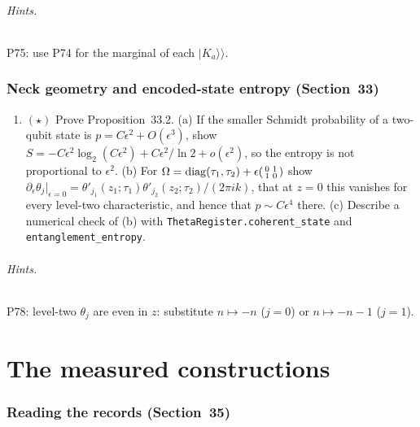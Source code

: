 \documentclass[11pt]{article}
\begin{document}
\paragraph{Hints.} P75: use P74 for the marginal of each $|K_a\rangle\!\rangle$.

\section{Neck geometry and encoded-state entropy (Section~33)}

\begin{enumerate}[label=\textbf{P\arabic*.},leftmargin=*,start=78]
\item $(\star)$ Prove Proposition~33.2. (a) If the smaller Schmidt probability of a
  two-qubit state is $p = C\epsilon^2+O(\epsilon^3)$, show
  $S = -C\epsilon^2\log_2(C\epsilon^2)+C\epsilon^2/\ln2+o(\epsilon^2)$, so the
  entropy is not proportional to $\epsilon^2$. (b) For
  $\Omega = \operatorname{diag}(\tau_1,\tau_2)+\epsilon\begin{psmallmatrix}0&1\\1&0\end{psmallmatrix}$
  show $\partial_\epsilon\theta_j|_{\epsilon=0} = \theta'_{j_1}(z_1;\tau_1)\theta'_{j_2}(z_2;\tau_2)/(2\pi ik)$,
  that at $z = 0$ this vanishes for every level-two characteristic, and
  hence that $p\sim C\epsilon^4$ there. (c) Describe a numerical check of (b)
  with \texttt{ThetaRegister.coherent\_state} and \texttt{entanglement\_entropy}.
\end{enumerate}

\paragraph{Hints.} P78: level-two $\theta_j$ are even in $z$: substitute $n\mapsto-n$ ($j = 0$) or $n\mapsto-n-1$ ($j = 1$).

\part*{The measured constructions}

\section{Reading the records (Section~35)}
\end{document}
